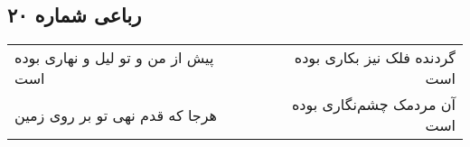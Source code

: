 \begin{center}
\section*{رباعی شماره ۲۰}
\label{sec:sh020}
\begin{longtable}{l p{0.5cm} r}
پیش از من و تو لیل و نهاری بوده است
&&
گردنده فلک نیز بکاری بوده است
\\
هرجا که قدم نهی تو بر روی زمین
&&
آن مردمک چشم‌نگاری بوده است
\\
\end{longtable}
\end{center}
